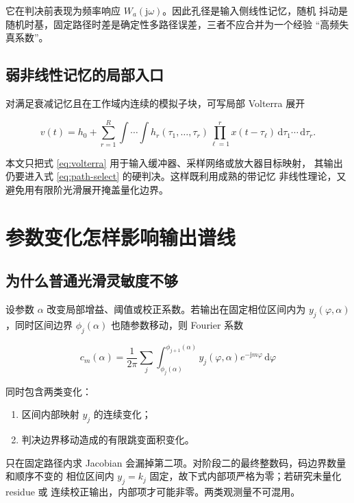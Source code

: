 \documentclass[11pt,a4paper]{ctexart}
\newcommand{\dd}{\,\mathrm{d}}
\newcommand{\jj}{\mathrm{j}}
\theoremstyle{adcplain}
\theoremstyle{definition}
\begin{document}
它在判决前表现为频率响应 $W_a(\jj\omega)$。因此孔径是输入侧线性记忆，随机
抖动是随机时基，固定路径时差是确定性多路径误差，三者不应合并为一个经验
“高频失真系数”。

\subsection{弱非线性记忆的局部入口}

对满足衰减记忆且在工作域内连续的模拟子块，可写局部 Volterra 展开

\begin{equation}
  v(t)
  =
  h_0
  +\sum_{r=1}^{R}
  \int\cdots\int
  h_r(\tau_1,\ldots,\tau_r)
  \prod_{\ell=1}^{r}x(t-\tau_\ell)
  \dd\tau_1\cdots\dd\tau_r.
  \label{eq:volterra}
\end{equation}

本文只把式 \eqref{eq:volterra} 用于输入缓冲器、采样网络或放大器目标映射，
其输出仍要进入式 \eqref{eq:path-select} 的硬判决。这样既利用成熟的带记忆
非线性理论，又避免用有限阶光滑展开掩盖量化边界。

\section{参数变化怎样影响输出谱线}

\subsection{为什么普通光滑灵敏度不够}

设参数 $\alpha$ 改变局部增益、阈值或校正系数。若输出在固定相位区间内为
$y_j(\varphi,\alpha)$，同时区间边界
$\phi_j(\alpha)$ 也随参数移动，则 Fourier 系数

\begin{equation}
  c_m(\alpha)
  =
  \frac{1}{2\pi}
  \sum_j
  \int_{\phi_j(\alpha)}^{\phi_{j+1}(\alpha)}
  y_j(\varphi,\alpha)e^{-\jj m\varphi}\dd\varphi
  \label{eq:param-fourier}
\end{equation}

同时包含两类变化：

\begin{enumerate}
  \item 区间内部映射 $y_j$ 的连续变化；
  \item 判决边界移动造成的有限跳变面积变化。
\end{enumerate}

只在固定路径内求 Jacobian 会漏掉第二项。对阶段二的最终整数码，码边界数量和顺序不变的
相位区间内 $y_j=k_j$ 固定，故下式内部项严格为零；若研究未量化 residue 或
连续校正输出，内部项才可能非零。两类观测量不可混用。
\end{document}
